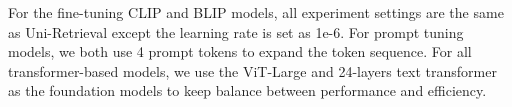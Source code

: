 For the fine-tuning CLIP and BLIP models, all experiment settings are the same as Uni-Retrieval except the learning rate is set as 1e-6. For prompt tuning models, we both use 4 prompt tokens to expand the token sequence. For all transformer-based models, we use the ViT-Large and 24-layers text transformer as the foundation models to keep balance between performance and efficiency.




